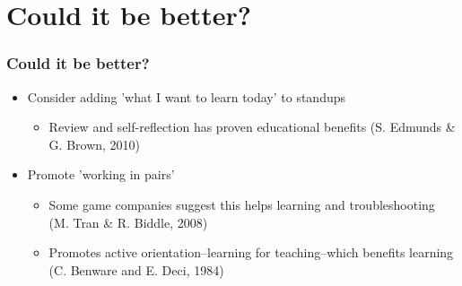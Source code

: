 \documentclass{beamer}
\begin{document}
\section{Could it be better?}
\begin{frame}
	\frametitle{Could it be better?}
	\begin{itemize}
		\item Consider adding 'what I want to learn today' to standups
		\begin{itemize}
			\item Review and self-reflection has proven educational benefits (S. Edmunds \& G. Brown, 2010)
		\end{itemize}
		\item Promote 'working in pairs'
		\begin{itemize}
			\item Some game companies suggest this helps learning and troubleshooting (M. Tran \& R. Biddle, 2008)
			\item Promotes active orientation--learning for teaching--which benefits learning (C. Benware and E. Deci, 1984)
		\end{itemize}
	\end{itemize}
\end{frame}

\nocite{*}


\end{document}
